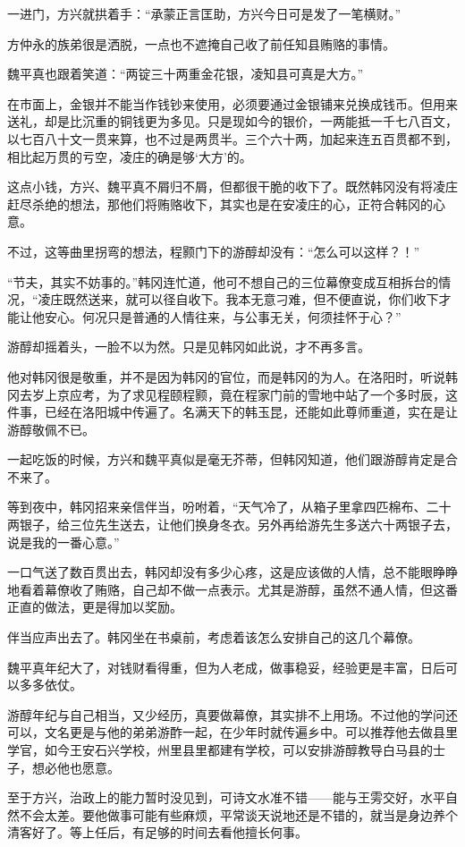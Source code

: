 一进门，方兴就拱着手：“承蒙正言匡助，方兴今日可是发了一笔横财。”

方仲永的族弟很是洒脱，一点也不遮掩自己收了前任知县贿赂的事情。

魏平真也跟着笑道：“两锭三十两重金花银，凌知县可真是大方。”

在市面上，金银并不能当作钱钞来使用，必须要通过金银铺来兑换成钱币。但用来送礼，却是比沉重的铜钱更为多见。只是现如今的银价，一两能抵一千七八百文，以七百八十文一贯来算，也不过是两贯半。三个六十两，加起来连五百贯都不到，相比起万贯的亏空，凌庄的确是够‘大方’的。

这点小钱，方兴、魏平真不屑归不屑，但都很干脆的收下了。既然韩冈没有将凌庄赶尽杀绝的想法，那他们将贿赂收下，其实也是在安凌庄的心，正符合韩冈的心意。

不过，这等曲里拐弯的想法，程颢门下的游醇却没有：“怎么可以这样？！”

“节夫，其实不妨事的。”韩冈连忙道，他可不想自己的三位幕僚变成互相拆台的情况，“凌庄既然送来，就可以径自收下。我本无意刁难，但不便直说，你们收下才能让他安心。何况只是普通的人情往来，与公事无关，何须挂怀于心？”

游醇却摇着头，一脸不以为然。只是见韩冈如此说，才不再多言。

他对韩冈很是敬重，并不是因为韩冈的官位，而是韩冈的为人。在洛阳时，听说韩冈去岁上京应考，为了求见程颐程颢，竟在程家门前的雪地中站了一个多时辰，这件事，已经在洛阳城中传遍了。名满天下的韩玉昆，还能如此尊师重道，实在是让游醇敬佩不已。

一起吃饭的时候，方兴和魏平真似是毫无芥蒂，但韩冈知道，他们跟游醇肯定是合不来了。

等到夜中，韩冈招来亲信伴当，吩咐着，“天气冷了，从箱子里拿四匹棉布、二十两银子，给三位先生送去，让他们换身冬衣。另外再给游先生多送六十两银子去，说是我的一番心意。”

一口气送了数百贯出去，韩冈却没有多少心疼，这是应该做的人情，总不能眼睁睁地看着幕僚收了贿赂，自己却不做一点表示。尤其是游醇，虽然不通人情，但这番正直的做法，更是得加以奖励。

伴当应声出去了。韩冈坐在书桌前，考虑着该怎么安排自己的这几个幕僚。

魏平真年纪大了，对钱财看得重，但为人老成，做事稳妥，经验更是丰富，日后可以多多依仗。

游醇年纪与自己相当，又少经历，真要做幕僚，其实排不上用场。不过他的学问还可以，文名更是与他的弟弟游酢一起，在少年时就传遍乡中。可以推荐他去做县里学官，如今王安石兴学校，州里县里都建有学校，可以安排游醇教导白马县的士子，想必他也愿意。

至于方兴，治政上的能力暂时没见到，可诗文水准不错——能与王雱交好，水平自然不会太差。要他做事可能有些麻烦，平常谈天说地还是不错的，就当是身边养个清客好了。等上任后，有足够的时间去看他擅长何事。

